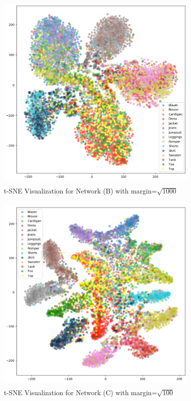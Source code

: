 \documentclass{article}
\begin{document}
\begin{figure}[H]
  \centering
    \includegraphics[width=10cm,height=10cm,keepaspectratio]{tSne_Plots/c_1000_t-sne.png}
    \caption{t-SNE Visualization for Network (B) with margin=$\sqrt{1000}$}
    \label{fig:df}
\end{figure}

\begin{figure}[H]
  \centering
    \includegraphics[width=10cm,height=10cm,keepaspectratio]{tSne_Plots/d_100_t-sne.png}
    \caption{t-SNE Visualization for Network (C) with margin=$\sqrt{100}$}
    \label{fig:fmnist}
\end{figure}
\end{document}
